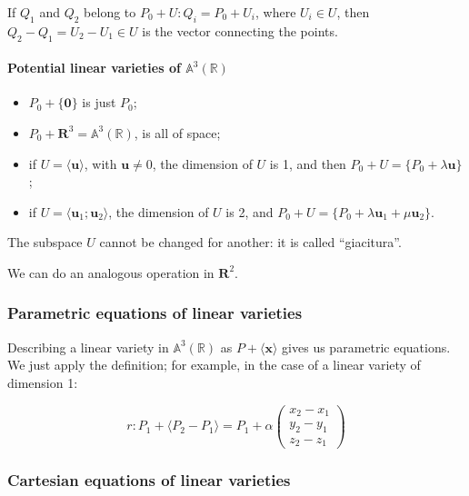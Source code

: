 \documentclass[12pt,a4paper]{report}
\numberwithin{equation}{section}
\theoremstyle{definition}
\theoremstyle{remark}
\begin{document}
If $Q_1$ and $Q_2$ belong to $P_0 + U: Q_i = P_0 + U_i$, where $U_i \in U$, then $Q_2-Q_1 = U_2 - U_1 \in U$ is the vector connecting the points.

\paragraph{Potential linear varieties of $\mathbb{A}^3 (\mathbb{R})$}

\begin{itemize}
\item $P_0 +\lbrace \mathbf{0}\rbrace$ is just $P_0$;
\item $P_0 + \mathbf{R}^3 = \mathbb{A}^3 (\mathbb{R})$, is all of space;
\item if $U = \langle\mathbf{u}\rangle$, with $\mathbf{u}\neq 0$, the dimension of $U$ is 1, and then $P_0 + U = \lbrace P_0 + \lambda \mathbf{u}\rbrace$;
\item if $U = \langle\mathbf{u}_1; \mathbf{u}_2\rangle$, the dimension of $U$ is 2, and $P_0 + U = \lbrace P_0 + \lambda \mathbf{u}_1 + \mu \mathbf{u}_2\rbrace$.
\end{itemize}

The subspace $U$ cannot be changed for another: it is called ``giacitura''.

We can do an analogous operation in $\mathbf{R}^2$.

\subsubsection{Parametric equations of linear varieties}

Describing a linear variety in $\mathbb{A}^3 (\mathbb{R})$ as $P + \langle \mathbf{x}\rangle$ gives us parametric equations.
We just apply the definition; for example, in the case of a linear variety of dimension 1:

\begin{equation}
r: P_1 + \langle P_2 - P_1\rangle = P_1 + \alpha \begin{pmatrix}
x_2 - x_1 \\
y_2 - y_1 \\
z_2 - z_1 
\end{pmatrix}
\end{equation}

\subsubsection{Cartesian equations of linear varieties}
\end{document}
